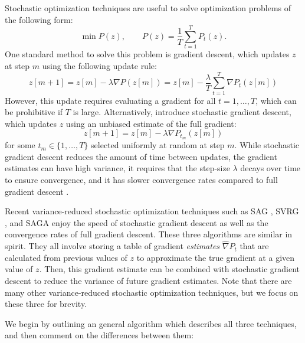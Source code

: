 Stochastic optimization techniques are useful to solve optimization problems of the following form:
%
\begin{equation*}
    \min P(z), \qquad P(z) = \frac{1}{T}\sum_{t = 1}^T P_t(z).
\end{equation*}
%
One standard method to solve this problem is gradient descent, which updates $z$ at step $m$ using the following update rule:
%
\begin{equation*}
    z[m+1] = z[m] - \lambda \nabla P(z[m]) =  z[m] - \frac{\lambda}{T} \sum_{t=1}^T \nabla P_t(z[m])
\end{equation*}
%
However, this update requires evaluating a gradient for all $t = 1,\ldots,T$, which can be prohibitive if $T$ is large. Alternatively, \citet{Robbins:1951} introduce stochastic gradient descent, which updates $z$ using an unbiased estimate of the full gradient:
%
\begin{equation*}
    z[m+1] = z[m] - \lambda \nabla P_{t_m}(z[m])
\end{equation*}
%
for some $t_m \in \{1,\ldots,T\}$ selected uniformly at random at step $m$. While stochastic gradient descent reduces the amount of time between updates, the gradient estimates can have high variance, it requires that the step-size $\lambda$ decays over time to ensure convergence, and it has slower convergence rates compared to full gradient descent \citep{Schmidt:2017}.

Recent variance-reduced stochastic optimization techniques such as SAG \citep{Schmidt:2017}, SVRG \citep{Johnson:2013}, and SAGA \citep{Defazio:2014} enjoy the speed of stochastic gradient descent as well as the convergence rates of full gradient descent. These three algorithms are similar in spirit. They all involve storing a table of gradient \textit{estimates} $\widehat \nabla P_t$ that are calculated from previous values of $z$ to approximate the true gradient at a given value of $z$. Then, this gradient estimate can be combined with stochastic gradient descent to reduce the variance of future gradient estimates. Note that there are many other variance-reduced stochastic optimization techniques, but we focus on these three for brevity. 

We begin by outlining an general algorithm which describes all three techniques, and then comment on the differences between them:

